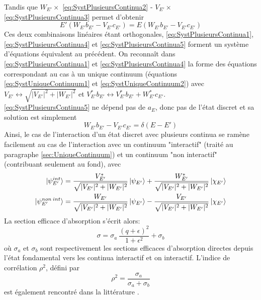Tandis que $W_{E'} \times$ \ref{eq:SystPlusieursContinua2} - $V_{E'} \times$ \ref{eq:SystPlusieursContinua3} permet d'obtenir 
\begin{equation}
E' \left( W_{E'} b_{E'} - V_{E'} c_{E'} \right) = E \left( W_{E'} b_{E'} - V_{E'} c_{E'} \right)
\label{eq:SystPlusieursContinua5}
\end{equation}
Ces deux combinaisons linéaires étant orthogonales, \ref{eq:SystPlusieursContinua1}, \ref{eq:SystPlusieursContinua4} et \ref{eq:SystPlusieursContinua5} forment un système d'équations équivalent au précédent. On reconnaît dans \ref{eq:SystPlusieursContinua1} et \ref{eq:SystPlusieursContinua4} la forme des équations correspondant au cas à un unique continuum (équations \ref{eq:SystUniqueContinuum1} et \ref{eq:SystUniqueContinuum2}) avec $V_{E'} \leftrightarrow \sqrt{|V_{E'}|^2 + |W_{E'}|^2}$ et $V^*_{E'} b_{E'} \leftrightarrow V^*_{E'} b_{E'} + W^*_{E'} c_{E'}$.\\
\ref{eq:SystPlusieursContinua5} ne dépend pas de $a_E$, donc pas de l'état discret et sa solution est simplement
\begin{equation}
W_{E'} b_{E'} - V_{E'} c_{E'} = \delta (E-E')
\end{equation}
Ainsi, le cas de l'interaction d'un état discret avec plusieurs continua se ramène facilement au cas de l'interaction avec un continuum "interactif" (traité au paragraphe \ref{sec:UniqueContinuum}) et un continuum "non interactif" (contribuant seulement au fond), avec
\begin{align}
\ket{\psi^{int}_{E'}} & = \frac{V^*_{E'}}{\sqrt{|V_{E'}|^2 + |W_{E'}|^2}} \ket{\psi_{E'}} + \frac{W^*_{E'}}{\sqrt{|V_{E'}|^2 + |W_{E'}|^2}} \ket{\chi_{E'}} \\
\ket{\psi^{non \: int}_{E'}} & = \frac{W_{E'}}{\sqrt{|V_{E'}|^2 + |W_{E'}|^2}} \ket{\psi_{E'}} - \frac{V_{E'}}{\sqrt{|V_{E'}|^2 + |W_{E'}|^2}} \ket{\chi_{E'}} 
\end{align}
La section efficace d'absorption s'écrit alors:
\begin{equation}
\sigma = \sigma_a \: \frac{\left(q + \epsilon \right) ^2}{1+\epsilon^2} + \sigma_b
\label{eq:SectionEff_PlusieursContinua}
\end{equation}
où $\sigma_a$ et $\sigma_b$ sont respectivement les sections efficaces d'absorption directes depuis l'état fondamental vers les continua interactif et on interactif. L'indice de corrélation $\rho^2$, défini par
\begin{equation}
\rho^2 = \frac{\sigma_a}{\sigma_a + \sigma_b}
\end{equation}
est également rencontré dans la littérature .

